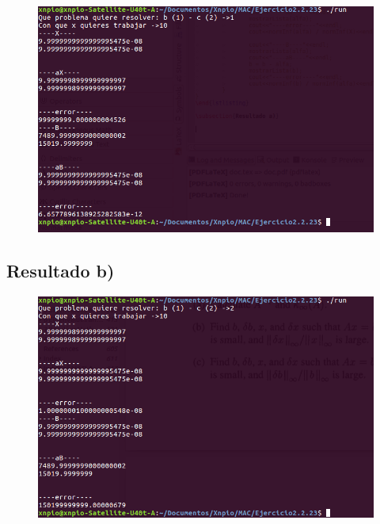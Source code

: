 \documentclass[a4paper,12pt]{article}
\begin{document}
\vspace{5mm}

\begin{figure}[h]
\centering
\includegraphics[scale=0.5]{1.png}
\end{figure}

\subsection{Resultado b)}

\begin{figure}[h]
\centering
\includegraphics[scale=0.5]{2.png}
\end{figure}
\end{document}
